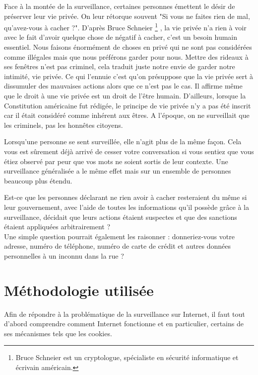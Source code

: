 Face à la montée de la surveillance, certaines personnes émettent le désir de préserver leur vie privée. On leur rétorque souvent "Si vous ne faites rien de mal, qu'avez-vous à cacher ?".
D'après Bruce Schneier \footnote{Bruce Schneier est un cryptologue, spécialiste en sécurité informatique et écrivain américain.} \cite{the_eternal_value_of_privacy}, la vie privée n'a rien à voir avec le fait d'avoir quelque chose de négatif à cacher, c'est un besoin humain essentiel.
Nous faisons énormément de choses en privé qui ne sont pas considérées comme illégales mais que nous préférons garder pour nous. Mettre des rideaux à ses fenêtres n'est pas criminel, cela traduit juste notre envie de garder notre intimité, vie privée.
Ce qui l'ennuie c'est qu'on présuppose que la vie privée sert à dissumuler des mauvaises actions alors que ce n'est pas le cas. Il affirme même que le droit à une vie privée est un droit de l'être humain. D'ailleurs, lorsque la Constitution américaine fut rédigée, le principe de vie privée n'y a pas été inscrit car il était considéré comme inhérent aux êtres. A l'époque, on ne surveillait que les criminels, pas les honnêtes citoyens.

Lorsqu'une personne se sent surveillée, elle n'agit plus de la même façon. Cela vous est sûrement déjà arrivé de cesser votre conversation si vous sentiez que vous étiez observé par peur que vos mots ne soient sortis de leur contexte. Une surveillance généralisée a le même effet mais sur un ensemble de personnes beaucoup plus étendu.
\newline

Est-ce que les personnes déclarant ne rien avoir à cacher resteraient du même si leur gouvernement, avec l'aide de toutes les informations qu'il possède grâce à la surveillance, décidait que leurs actions étaient suspectes et que des sanctions étaient appliquées arbitrairement ?\\
Une simple question pourrait également les raisonner : donneriez-vous votre adresse, numéro de téléphone, numéro de carte de crédit et autres données personnelles à un inconnu dans la rue ?

\section{Méthodologie utilisée}
Afin de répondre à la problématique de la surveillance sur Internet, il faut tout d'abord comprendre comment Internet fonctionne et en particulier, certains de ses mécanismes tels que les cookies.

